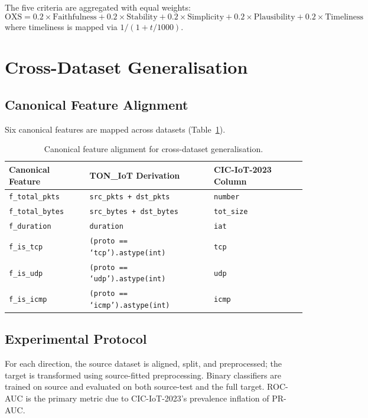 \documentclass[12pt,a4paper]{report}
\begin{document}
The five criteria are aggregated with equal weights:
\begin{equation}
\text{OXS} = 0.2 \times \text{Faithfulness} + 0.2 \times \text{Stability} + 0.2 \times \text{Simplicity} + 0.2 \times \text{Plausibility} + 0.2 \times \text{Timeliness}
\end{equation}
where timeliness is mapped via $1 / (1 + t / 1000)$.

\section{Cross-Dataset Generalisation}
\label{sec:cross-dataset}

\subsection{Canonical Feature Alignment}
\label{sec:alignment}

Six canonical features are mapped across datasets (Table~\ref{tab:canonical}).

\begin{table}[H]
\centering
\caption{Canonical feature alignment for cross-dataset generalisation.}
\label{tab:canonical}
\begin{tabular}{lll}
\toprule
\textbf{Canonical Feature} & \textbf{TON\_IoT Derivation} & \textbf{CIC-IoT-2023 Column} \\
\midrule
\texttt{f\_total\_pkts} & \texttt{src\_pkts + dst\_pkts} & \texttt{number} \\
\texttt{f\_total\_bytes} & \texttt{src\_bytes + dst\_bytes} & \texttt{tot\_size} \\
\texttt{f\_duration} & \texttt{duration} & \texttt{iat} \\
\texttt{f\_is\_tcp} & \texttt{(proto == `tcp').astype(int)} & \texttt{tcp} \\
\texttt{f\_is\_udp} & \texttt{(proto == `udp').astype(int)} & \texttt{udp} \\
\texttt{f\_is\_icmp} & \texttt{(proto == `icmp').astype(int)} & \texttt{icmp} \\
\bottomrule
\end{tabular}
\end{table}

\subsection{Experimental Protocol}
\label{sec:cross-protocol}

For each direction, the source dataset is aligned, split, and preprocessed; the target is transformed using source-fitted preprocessing. Binary classifiers are trained on source and evaluated on both source-test and the full target. ROC-AUC is the primary metric due to CIC-IoT-2023's prevalence inflation of PR-AUC.
\end{document}

